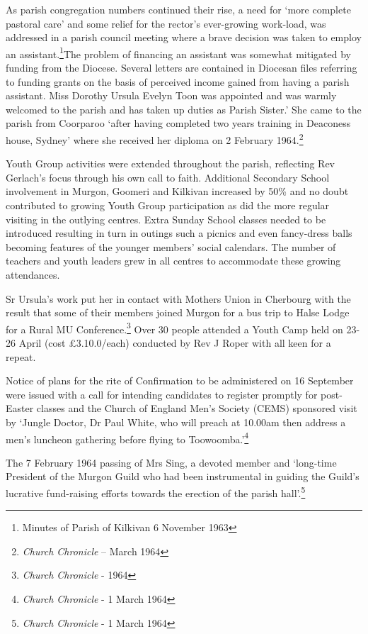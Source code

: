 As parish congregation numbers continued their rise, a need for `more complete pastoral care' and some relief for the rector's ever-growing work-load, was addressed in a parish council meeting where a brave decision was taken to employ an assistant.\footnote{Minutes of Parish of Kilkivan 6 November 1963}The problem of financing an assistant was somewhat mitigated by funding from the Diocese. Several letters are contained in Diocesan files referring to funding grants on the basis of perceived income gained from having a parish assistant. Miss Dorothy Ursula Evelyn Toon was appointed and was warmly welcomed to the parish and has taken up duties as Parish Sister.' She came to the parish from Coorparoo `after having completed two years training in Deaconess house, Sydney' where she received her diploma on 2 February 1964.\footnote{\emph{Church Chronicle} -- March 1964}

Youth Group activities were extended throughout the parish, reflecting Rev Gerlach's focus through his own call to faith. Additional Secondary School involvement in Murgon, Goomeri and Kilkivan increased by 50\% and no doubt contributed to growing Youth Group participation as did the more regular visiting in the outlying centres. Extra Sunday School classes needed to be introduced resulting in turn in outings such a picnics and even fancy-dress balls becoming features of the younger members' social calendars. The number of teachers and youth leaders grew in all centres to accommodate these growing attendances.

Sr Ursula's work put her in contact with Mothers Union in Cherbourg with the result that some of their members joined Murgon for a bus trip to Halse Lodge for a Rural MU Conference.\footnote{\emph{Church Chronicle} - 1964} Over 30 people attended a Youth Camp held on 23-26 April (cost £3.10.0/each) conducted by Rev J Roper with all keen for a repeat.

Notice of plans for the rite of Confirmation to be administered on 16 September were issued with a call for intending candidates to register promptly for post-Easter classes and the Church of England Men's Society (CEMS) sponsored visit by `Jungle Doctor, Dr Paul White, who will preach at 10.00am then address a men's luncheon gathering before flying to Toowoomba.'\footnote{\emph{Church Chronicle} - 1 March 1964}

The 7 February 1964 passing of Mrs Sing, a devoted member and `long-time President of the Murgon Guild who had been instrumental in guiding the Guild's lucrative fund-raising efforts towards the erection of the parish hall'.\footnote{\emph{Church Chronicle} - 1 March 1964}


